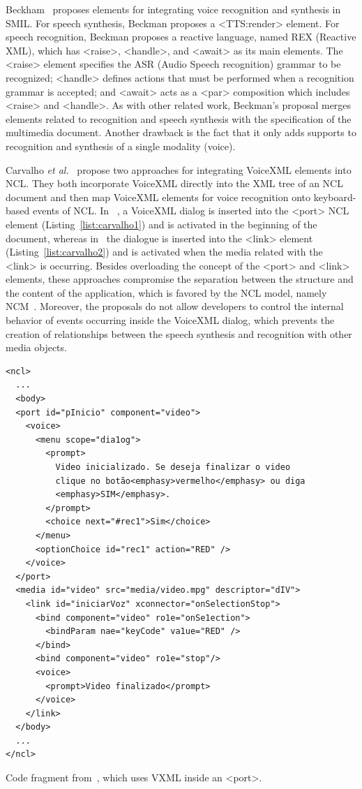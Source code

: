 \documentclass[
  doutorado,
  american
]{ThesisPUC}
\newcommand{\lis}[1]{Listing~\ref{#1}}
\begin{document}
Beckham~\cite{beckham_towards_2001} proposes elements for integrating voice
recognition and synthesis in SMIL. For speech synthesis, Beckman proposes a
<TTS:render> element. For speech recognition, Beckman proposes a reactive
language, named REX (Reactive XML), which has <raise>, <handle>, and <await> as
its main elements. The <raise> element specifies the ASR (Audio Speech
recognition) grammar to be recognized; <handle> defines actions that must be
performed when a recognition grammar is accepted; and <await> acts as a <par>
composition which includes <raise> and <handle>. As with other related work,
Beckman’s proposal merges elements related to recognition and speech synthesis
with the specification of the multimedia document. Another drawback is the fact
that it only adds supports to recognition and synthesis of a single modality
(voice).

Carvalho \textit{et al.}~\cite{carvalho_architectures_2008,carvalho_estendendo_2010}
propose two approaches for integrating VoiceXML elements into NCL. They both
incorporate VoiceXML directly into the XML tree of an NCL document and then map
VoiceXML elements for voice recognition onto keyboard-based events of NCL. In
~\cite{carvalho_architectures_2008}, a VoiceXML dialog is inserted into the
<port> NCL element (\lis{list:carvalho1}) and is activated in the beginning of
the document, whereas in~\cite{carvalho_estendendo_2010} the dialogue is
inserted into the <link> element (\lis{list:carvalho2}) and is activated when
the media related with the <link> is occurring. Besides overloading the concept
of the <port> and <link> elements, these approaches compromise the separation
between the structure and the content of the application, which is favored by
the NCL model, namely NCM~\cite{soares_nested_2009}. Moreover, the proposals do
not allow developers to control the internal behavior of events occurring inside
the VoiceXML dialog, which prevents the creation of relationships between the
speech synthesis and recognition with other media objects.

\begin{listing}[!ht]
\begin{verbatim}
<ncl>
  ...
  <body>
  <port id="pInicio" component="video">
    <voice>
      <menu scope="dia1og">
        <prompt>
          Video inicializado. Se deseja finalizar o video
          clique no botão<emphasy>vermelho</emphasy> ou diga
          <emphasy>SIM</emphasy>.
        </prompt>
        <choice next="#rec1">Sim</choice>
      </menu>
      <optionChoice id="rec1" action="RED" />
    </voice>
  </port>
  <media id="video" src="media/video.mpg" descriptor="dIV">
    <link id="iniciarVoz" xconnector="onSelectionStop">
      <bind component="video" ro1e="onSe1ection">
        <bindParam nae="keyCode" va1ue="RED" />
      </bind>
      <bind component="video" ro1e="stop"/>
      <voice>
        <prompt>Video finalizado</prompt>
      </voice>
    </link>
  </body>
  ...
</ncl>
\end{verbatim}
\caption[NCL using VXML inside an <port>.]{Code fragment 
from~\cite{carvalho_architectures_2008}, which uses VXML inside an <port>.}
\label{list:carvalho1}
\end{listing}
\end{document}
